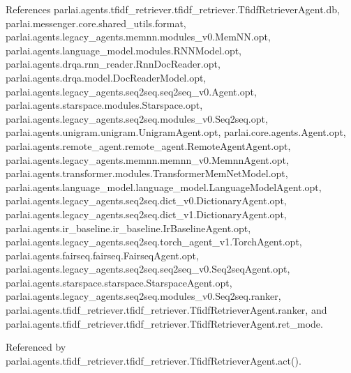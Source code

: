 References parlai.\+agents.\+tfidf\+\_\+retriever.\+tfidf\+\_\+retriever.\+Tfidf\+Retriever\+Agent.\+db, parlai.\+messenger.\+core.\+shared\+\_\+utils.\+format, parlai.\+agents.\+legacy\+\_\+agents.\+memnn.\+modules\+\_\+v0.\+Mem\+N\+N.\+opt, parlai.\+agents.\+language\+\_\+model.\+modules.\+R\+N\+N\+Model.\+opt, parlai.\+agents.\+drqa.\+rnn\+\_\+reader.\+Rnn\+Doc\+Reader.\+opt, parlai.\+agents.\+drqa.\+model.\+Doc\+Reader\+Model.\+opt, parlai.\+agents.\+legacy\+\_\+agents.\+seq2seq.\+seq2seq\+\_\+v0.\+Agent.\+opt, parlai.\+agents.\+starspace.\+modules.\+Starspace.\+opt, parlai.\+agents.\+legacy\+\_\+agents.\+seq2seq.\+modules\+\_\+v0.\+Seq2seq.\+opt, parlai.\+agents.\+unigram.\+unigram.\+Unigram\+Agent.\+opt, parlai.\+core.\+agents.\+Agent.\+opt, parlai.\+agents.\+remote\+\_\+agent.\+remote\+\_\+agent.\+Remote\+Agent\+Agent.\+opt, parlai.\+agents.\+legacy\+\_\+agents.\+memnn.\+memnn\+\_\+v0.\+Memnn\+Agent.\+opt, parlai.\+agents.\+transformer.\+modules.\+Transformer\+Mem\+Net\+Model.\+opt, parlai.\+agents.\+language\+\_\+model.\+language\+\_\+model.\+Language\+Model\+Agent.\+opt, parlai.\+agents.\+legacy\+\_\+agents.\+seq2seq.\+dict\+\_\+v0.\+Dictionary\+Agent.\+opt, parlai.\+agents.\+legacy\+\_\+agents.\+seq2seq.\+dict\+\_\+v1.\+Dictionary\+Agent.\+opt, parlai.\+agents.\+ir\+\_\+baseline.\+ir\+\_\+baseline.\+Ir\+Baseline\+Agent.\+opt, parlai.\+agents.\+legacy\+\_\+agents.\+seq2seq.\+torch\+\_\+agent\+\_\+v1.\+Torch\+Agent.\+opt, parlai.\+agents.\+fairseq.\+fairseq.\+Fairseq\+Agent.\+opt, parlai.\+agents.\+legacy\+\_\+agents.\+seq2seq.\+seq2seq\+\_\+v0.\+Seq2seq\+Agent.\+opt, parlai.\+agents.\+starspace.\+starspace.\+Starspace\+Agent.\+opt, parlai.\+agents.\+legacy\+\_\+agents.\+seq2seq.\+modules\+\_\+v0.\+Seq2seq.\+ranker, parlai.\+agents.\+tfidf\+\_\+retriever.\+tfidf\+\_\+retriever.\+Tfidf\+Retriever\+Agent.\+ranker, and parlai.\+agents.\+tfidf\+\_\+retriever.\+tfidf\+\_\+retriever.\+Tfidf\+Retriever\+Agent.\+ret\+\_\+mode.



Referenced by parlai.\+agents.\+tfidf\+\_\+retriever.\+tfidf\+\_\+retriever.\+Tfidf\+Retriever\+Agent.\+act().

